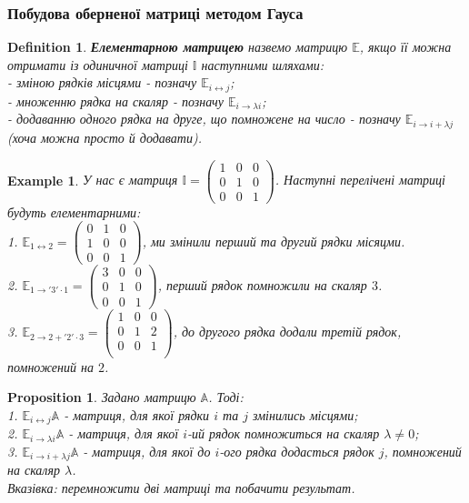 \documentclass[a4paper, 10pt]{article}
\theoremstyle{theoremdd}
\newtheorem{definition}[theorem]{Definition}
\newtheorem{example}[theorem]{Example}
\newtheorem{proposition}[theorem]{Proposition}
\begin{document}
\subsubsection*{Побудова оберненої матриці методом Гауса}
\begin{definition}
\textbf{Елементарною матрицею} назвемо матрицю $\mathbb{E}$, якщо її можна отримати із одиничної матриці $\mathbb{I}$ наступними шляхами:\\
	- зміною рядків місцями - позначу $\mathbb{E}_{i \leftrightarrow j}$;\\
	- множенню рядка на скаляр - позначу $\mathbb{E}_{i \rightarrow \lambda i}$;\\
	- додаванню одного рядка на друге, що помножене на число - позначу $\mathbb{E}_{i \rightarrow i + \lambda j}$ (хоча можна просто й додавати).
\end{definition}

\begin{example}
	У нас є матриця $\mathbb{I} = \begin{pmatrix}
	1 & 0 & 0 \\
	0 & 1 & 0 \\
	0 & 0 & 1
	\end{pmatrix}$. Наступні перелічені матриці будуть елементарними:\\
	1. $\mathbb{E}_{1 \leftrightarrow 2} = \begin{pmatrix}
	0 & 1 & 0 \\
	1 & 0 & 0 \\
	0 & 0 & 1 
	\end{pmatrix}$, ми змінили перший та другий рядки місяцми.\\
	2. $\mathbb{E}_{1 \rightarrow '3' \cdot 1} = \begin{pmatrix}
	3 & 0 & 0 \\
	0 & 1 & 0 \\
	0 & 0 & 1
	\end{pmatrix}$, перший рядок помножили на скаляр $3$.\\
	3. $\mathbb{E}_{2 \rightarrow 2 + '2'\cdot 3} = \begin{pmatrix}
	1 & 0 & 0 \\
	0 & 1 & 2 \\
	0 & 0 & 1 \\
	\end{pmatrix}$, до другого рядка додали третій рядок, помножений на $2$.
\end{example}

\begin{proposition}
Задано матрицю $\mathbb{A}$. Тоді:\\
	1. $\mathbb{E}_{i \leftrightarrow j}\mathbb{A}$ - матриця, для якої рядки $i$ та $j$ змінились місцями;\\
	2. $\mathbb{E}_{i \rightarrow \lambda i}\mathbb{A}$ - матриця, для якої $i$-ий рядок помножиться на скаляр $\lambda \neq 0$;\\
	3. $\mathbb{E}_{i \rightarrow i + \lambda j}\mathbb{A}$ - матриця, для якої до $i$-ого рядка додасться рядок $j$, помножений на скаляр $\lambda$.\\
	\textit{Вказівка: перемножити дві матриці та побачити результат.}
\end{proposition}
\end{document}
